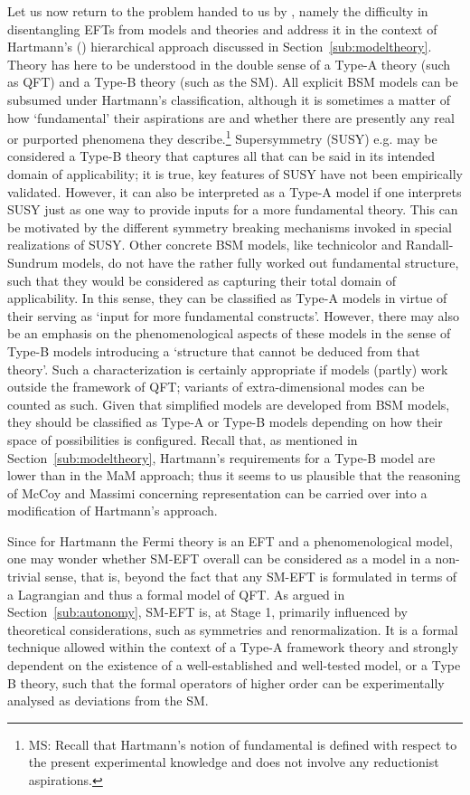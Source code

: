 Let us now return to the problem handed to us by \citet{hartmann2001}, namely the difficulty in disentangling EFTs from models and theories and address it in the context of Hartmann's (\citeyear{hartmann95}) hierarchical approach discussed in Section~\ref{sub:modeltheory}. 
Theory has here to be understood in the double sense of a Type-A theory (such as QFT) and a Type-B theory (such as the SM). 
All explicit BSM models can be subsumed under Hartmann's classification, although it is sometimes a matter of how `fundamental' their aspirations are and whether there are presently any real or purported phenomena they describe.\footnote{MS: Recall that Hartmann's notion of fundamental is defined with respect to the present experimental knowledge and does not involve any reductionist aspirations.}
Supersymmetry (SUSY) e.g. may be considered a Type-B theory %
that captures all that can be said in its intended domain of applicability; it is true, key features of SUSY have not been empirically validated. 
However, it can also be interpreted as a Type-A model if one interprets SUSY just as one way to provide inputs for a more fundamental theory. 
This can be motivated by the different symmetry breaking mechanisms invoked in special realizations of SUSY. 
Other concrete BSM models, like technicolor and Randall-Sundrum models, do not have the rather fully worked out fundamental structure, such that they would be considered as capturing their total domain of applicability. 
In this sense, they can be classified as Type-A models in virtue of their serving as `input for more fundamental constructs'. 
However, there may also be an emphasis on the phenomenological aspects of these models in the sense of Type-B models introducing a `structure that cannot be deduced from that theory'. 
Such a characterization is certainly appropriate if models (partly) work outside the framework of QFT; variants of extra-dimensional modes can be counted as such. 
Given that simplified models are developed from BSM models, they should be classified as Type-A or Type-B models depending on how their space of possibilities is configured.
Recall that, as mentioned in Section~\ref{sub:modeltheory}, Hartmann's requirements for a Type-B model are lower than in the MaM approach; thus it seems to us plausible that the reasoning of McCoy and Massimi concerning representation can be carried over into a modification of Hartmann's approach.

Since for Hartmann the Fermi theory is an EFT and a phenomenological model, one may wonder whether SM-EFT overall can be considered as a model in a non-trivial sense, that is, beyond the fact that any SM-EFT is formulated in terms of a Lagrangian and thus a formal model of QFT.
As argued in Section~\ref{sub:autonomy}, SM-EFT is, at Stage 1, primarily influenced by theoretical considerations, such as symmetries and renormalization. 
It is a formal technique allowed within the context of a Type-A framework theory and strongly dependent on the existence of a well-established and well-tested model, or a Type B theory, such that the formal operators of higher order can be experimentally analysed as deviations from the SM. 

